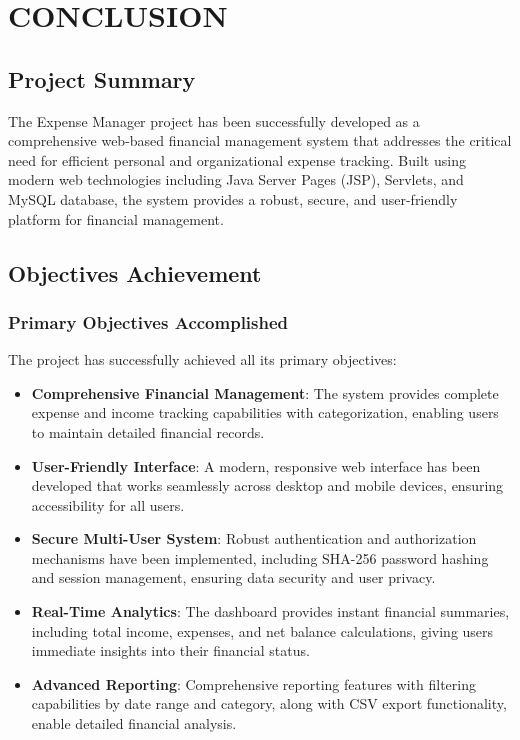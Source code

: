 \chapter{CONCLUSION}

\section{Project Summary}

The Expense Manager project has been successfully developed as a comprehensive web-based financial management system that addresses the critical need for efficient personal and organizational expense tracking. Built using modern web technologies including Java Server Pages (JSP), Servlets, and MySQL database, the system provides a robust, secure, and user-friendly platform for financial management.

\section{Objectives Achievement}

\subsection{Primary Objectives Accomplished}

The project has successfully achieved all its primary objectives:

\begin{itemize}
    \item \textbf{Comprehensive Financial Management}: The system provides complete expense and income tracking capabilities with categorization, enabling users to maintain detailed financial records.
    
    \item \textbf{User-Friendly Interface}: A modern, responsive web interface has been developed that works seamlessly across desktop and mobile devices, ensuring accessibility for all users.
    
    \item \textbf{Secure Multi-User System}: Robust authentication and authorization mechanisms have been implemented, including SHA-256 password hashing and session management, ensuring data security and user privacy.
    
    \item \textbf{Real-Time Analytics}: The dashboard provides instant financial summaries, including total income, expenses, and net balance calculations, giving users immediate insights into their financial status.
    
    \item \textbf{Advanced Reporting}: Comprehensive reporting features with filtering capabilities by date range and category, along with CSV export functionality, enable detailed financial analysis.
\end{itemize}

